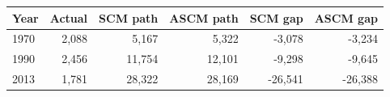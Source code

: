 \begin{tabular}{lrrrrr}
\toprule
Year & Actual & SCM path & ASCM path & SCM gap & ASCM gap \\
\midrule
1970 & 2,088 & 5,167 & 5,322 & -3,078 & -3,234 \\
1990 & 2,456 & 11,754 & 12,101 & -9,298 & -9,645 \\
2013 & 1,781 & 28,322 & 28,169 & -26,541 & -26,388 \\
\bottomrule
\end{tabular}

